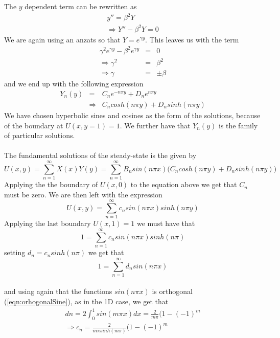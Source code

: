 \documentclass{article}
\begin{document}
The $y$ dependent term can be rewritten as 
\begin{subequations}
\begin{eqnarray}
y'' = \beta^2 Y \\ 
\Rightarrow Y'' - \beta^2 Y = 0 
\end{eqnarray}
\end{subequations}
We are again using an anzats so that $Y = e^{\gamma y}$. This leaves us with the term
\begin{subequations}
\begin{eqnarray}
\gamma^2 e^{\gamma y} - \beta^2 e^{\gamma y} &=& 0 \\ 
\Rightarrow \gamma^2 &=& \beta^2 \\ 
\Rightarrow \gamma &=& \pm \beta
\end{eqnarray}
\end{subequations}
and we end up with the following expression
\begin{eqnarray}
Y_n(y) &=& C_ne^{-n\pi y} + D_ne^{n\pi y} \\ 
&\Rightarrow & C_ncosh(n\pi y) + D_nsinh(n\pi y)
\end{eqnarray}
We have chosen hyperbolic sines and cosines as the form of the solutions, because of the boundary at $U(x,y=1) = 1$. We further have that {$Y_n(y)$} is the family of particular solutions.
\\
\\
The fundamental solutions of the steady-state is the given by
\begin{equation}
U(x,y) = \sum_{n=1}^{\infty} X(x)Y(y) = \sum_{n=1}^{\infty} B_nsin(n\pi x)\Big(C_ncosh(n\pi y) + D_nsinh(n\pi y)\Big)
\end{equation}
Applying the the boundary of $U(x,0)$ to the equation above we get that $C_n$ must be zero. We are then left with the expression
\begin{equation}
 U(x,y) = \sum_{n=1}^{\infty} c_n sin(n\pi x)sinh(n\pi y)
\end{equation}
Applying the last boundary $U(x,1) = 1$ we must have that
\begin{equation}
1 = \sum_{n=1}^{\infty} c_n sin(n\pi x)sinh(n\pi)
\end{equation}
setting $d_n = c_nsinh(n\pi)$ we get that 
\begin{equation}
1 = \sum_{n=1}^{\infty} d_n sin(n\pi x)
\end{equation}
\\
and using again that the functions $sin(n\pi x)$ is orthogonal (\ref{eqn:orhogonalSine}), as in the 1D case, we get that 
\begin{subequations}
\begin{eqnarray}
dn = 2\int_0^1 sin(m\pi x) dx = \frac{2}{m\pi}(1-(-1)^m\\
\Rightarrow c_n = \frac{2}{m\pi sinh(m\pi)}(1-(-1)^m
\end{eqnarray}
\end{subequations}
\end{document}
